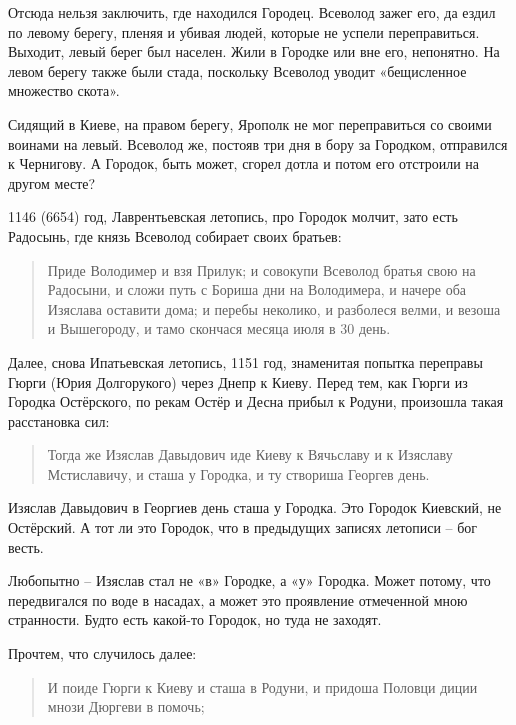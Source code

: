 Отсюда нельзя заключить, где находился Городец.  Всеволод зажег его, да ездил по левому берегу, пленяя и убивая людей, которые не успели переправиться. Выходит, левый берег был населен. Жили в Городке или вне его, непонятно. На левом берегу также были стада, поскольку Всеволод уводит «бещисленное множество скота».

Сидящий в Киеве, на правом берегу, Ярополк не мог переправиться со своими воинами на левый. Всеволод же, постояв три дня в бору за Городком, отправился к Чернигову. А Городок, быть может, сгорел дотла и потом его отстроили на другом месте?

1146 (6654) год, Лаврентьевская летопись, про Городок молчит, зато есть Радосынь, где князь Всеволод собирает своих братьев:

\begin{quotation}
Приде Володимер и взя Прилук; и совокупи Всеволод братья свою на Радосыни, и сложи путь с Бориша дни на Володимера, и начере оба Изяслава оставити дома; и перебы неколико, и разболеся велми, и везоша и Вышегороду, и тамо скончася месяца июля в 30 день.
\end{quotation}

Далее, снова Ипатьевская летопись, 1151 год, знаменитая попытка переправы Гюрги (Юрия Долгорукого) через Днепр к Киеву. Перед тем, как Гюрги из Городка Остёрского, по рекам Остёр и Десна прибыл к Родуни, произошла такая расстановка сил:

\begin{quotation}
Тогда же Изяслав Давыдович иде Киеву к Вячьславу и к Изяславу Мстиславичу, и сташа у Городка, и ту створиша Георгев день.
\end{quotation}

Изяслав Давыдович в Георгиев день сташа у Городка. Это Городок Киевский, не Остёрский. А тот ли это Городок, что в предыдущих записях летописи – бог весть.


Любопытно – Изяслав стал не «в» Городке, а «у» Городка. Может потому, что передвигался по воде в насадах, а может это проявление отмеченной мною странности. Будто есть какой-то Городок, но туда не заходят.

Прочтем, что случилось далее: 

\begin{quotation}
И поиде Гюрги к Киеву и сташа в Родуни, и придоша Половци диции мнози Дюргеви в помочь;
\end{quotation}

